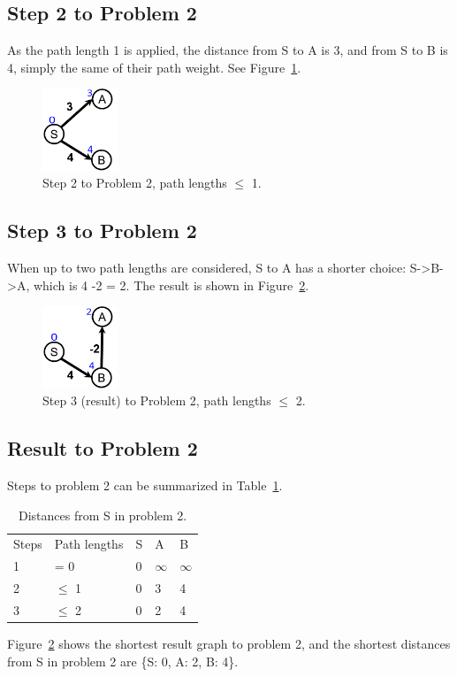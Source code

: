 \documentclass[doc,natbib,12pt]{article}
\begin{document}
	\subsection*{Step 2 to Problem 2}
	
	As the path length 1 is applied, the distance from S to A is 3, and from S to B is 4, simply the same of their path weight. See Figure~\ref{fig:problem2-step2}.
	
	\begin{figure}[htpb]
		\centering
		\includegraphics[width=0.2\textwidth]{2-2.png}
		\caption{\label{fig:problem2-step2}Step 2 to Problem 2, path lengths $\le$ 1.}
	\end{figure}
	
	\subsection*{Step 3 to Problem 2}
	
	When up to two path lengths are considered, S to A has a shorter choice: S->B->A, which is 4 -2 = 2. The result is shown in Figure~\ref{fig:problem2-step3}.
	
	\begin{figure}[htpb]
		\centering
		\includegraphics[width=0.2\textwidth]{2-3.png}
		\caption{\label{fig:problem2-step3}Step 3 (result) to Problem 2, path lengths $\le$ 2.}
	\end{figure}
	
	\subsection*{Result to Problem 2}
	
	Steps to problem 2 can be summarized in Table~\ref{tab:problem2-result}. 
	
	\begin{table}[htpb]
		\centering
		\begin{tabular}{lllll}
			Steps & Path lengths                 & S & A & B    \\ \cline{1-5} 
			1 & \multicolumn{1}{l|}{= 0} & 0 & $\infty$ & $\infty$ \\
			2 & \multicolumn{1}{l|}{$\le$ 1 } &0 & 3 & 4    \\
			3 & \multicolumn{1}{l|}{$\le$ 2} & 0 & 2 & 4   
		\end{tabular}
		\caption{\label{tab:problem2-result}Distances from S in problem 2.}
	\end{table}
	
	Figure~\ref{fig:problem2-step3} shows the shortest result graph to problem 2, and the shortest distances from S in problem 2 are \{S: 0, A: 2, B: 4\}.
	
	
	
\end{document}
